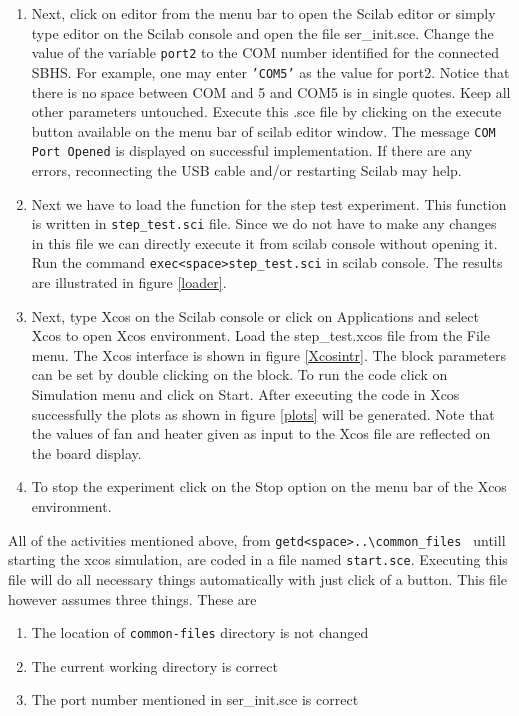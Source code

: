 \begin{enumerate}
\item Next, click on {\ttfamily editor} from the menu bar to open the Scilab editor or simply type {\ttfamily editor} on the Scilab console and open the file {\ttfamily ser\_init.sce}. Change the value of the variable {\tt port2} to the COM number identified for the connected SBHS. For example, one may enter {\tt 'COM5'} as the value for port2. Notice that there is no space between COM and 5 and COM5 is in single quotes.  Keep all other parameters untouched. Execute this .sce file by clicking on the execute button available on the menu bar of scilab editor window. The message {\tt COM Port Opened} is displayed on successful implementation. If there are any errors, reconnecting the USB cable and/or restarting Scilab may help.
\item Next we have to load the function for the step test experiment. This function is written in {\tt step\_test.sci} file. Since we do not have to make any changes in this file we can directly execute it from scilab console without opening it. Run the command {\tt exec<space>step\_test.sci} in scilab console.  The results are illustrated in figure \ref{loader}. 

\item Next, type {\ttfamily Xcos} on the Scilab console or click on { \ttfamily Applications} and select {\ttfamily Xcos} to open Xcos environment. Load the {\ttfamily step\_test.xcos} file from the { \ttfamily File} menu. The Xcos interface is shown in figure \ref{Xcosintr}. The block parameters can be set by double clicking on the block. To run the code click on {\ttfamily Simulation} menu and click on {\ttfamily Start}. After executing the code in Xcos successfully the plots as shown in figure \ref{plots} will be generated. Note that the values of fan and heater given as input to the Xcos file are reflected on the board display. 
\item To stop the experiment click on the {\ttfamily Stop} option on the menu bar of the Xcos environment. 
\end{enumerate}



All of the activities mentioned above, from {\tt getd<space>..\textbackslash common\_files\ } untill starting the xcos simulation, are coded in a file named {\tt start.sce}. Executing this file will do all necessary things automatically with just click of a button. This file however assumes three things. These are

\begin{enumerate}
\item The location of {\tt common-files} directory is not changed 
\item The current working directory is correct
\item The port number mentioned in  {\ttfamily ser\_init.sce} is correct
\end{enumerate}

